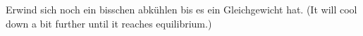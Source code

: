 Erwind sich noch ein bisschen abkühlen bis es ein Gleichgewicht hat.  
(It will cool down a bit further until it reaches equilibrium.)